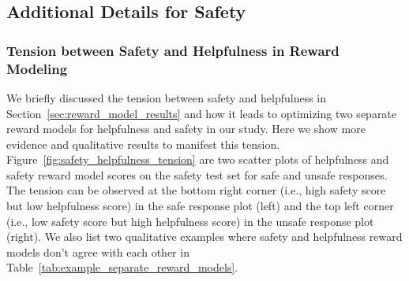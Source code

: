 


\subsection{Additional Details for Safety}

\subsubsection{Tension between Safety and Helpfulness in Reward Modeling}
\label{sec:tension_safety_helpfulness}

We briefly discussed the tension between safety and helpfulness in Section~\ref{sec:reward_model_results} and how it leads to optimizing two separate reward models for helpfulness and safety in our study.
Here we show more evidence and qualitative results to manifest this tension.
Figure~\ref{fig:safety_helpfulness_tension} are two scatter plots of helpfulness and safety reward model scores on the safety test set for safe and unsafe responses.
The tension can be observed at the bottom right corner (i.e., high safety score but low helpfulness score) in the safe response plot (left) and the top left corner (i.e., low safety score but high helpfulness score) in the unsafe response plot (right).
We also list two qualitative examples where safety and helpfulness reward models don't agree with each other in Table~\ref{tab:example_separate_reward_models}.

